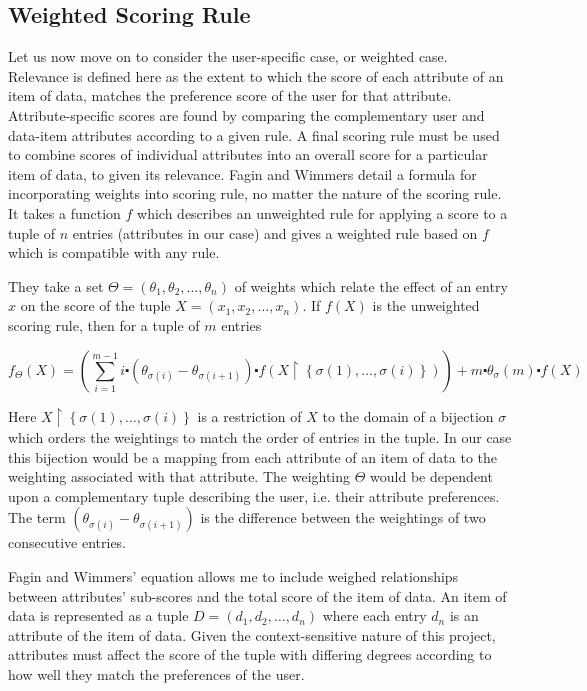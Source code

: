 \subsection{Weighted Scoring Rule}

Let us now move on to consider the user-specific case, or weighted case. Relevance is defined here as the extent to which the score of each attribute of an item of data, matches the preference score of the user for that attribute. Attribute-specific scores are found by comparing the complementary user and data-item attributes according to a given rule. A final scoring rule must be used to combine scores of individual attributes into an overall score for a particular item of data, to given its relevance.
Fagin and Wimmers \cite{FaginWimmers1} detail a formula for incorporating weights into scoring rule, no matter the nature of the scoring rule. It takes a function $f$ which describes an unweighted rule for applying a score to a tuple of $n$ entries (attributes in our case) and gives a weighted rule based on $f$ which is compatible with any rule. 

They take a set $\Theta = (\theta_1,\theta_2,\dotsc,\theta_n)$ of weights which relate the effect of an entry $x$ on the score of the tuple $ X = (x_1, x_2, \dots, x_n)$. If $f(X)$ is the unweighted scoring rule, then for a tuple of $m$ entries

\begin{equation}\label{WeightedRule}	
	f_\Theta (X) = \left(\sum_{i=1}^{m-1} i\centerdot (\theta_{\sigma{(i)}} - \theta_{\sigma{(i+1)}})\centerdot f(X\upharpoonright\left\{\sigma(1),\dots,\sigma(i)\right\})\right) + m \centerdot \theta_\sigma{(m)} \centerdot f(X)
\end{equation}

Here $X\upharpoonright\left\{\sigma(1),\dots,\sigma(i)\right\}$ is a restriction of $X$ to the domain of a bijection $\sigma$ which orders the weightings to match the order of entries in the tuple. In our case this bijection would be a mapping from each attribute of an item of data to the weighting associated with that attribute. The weighting $\Theta$ would be dependent upon a complementary tuple describing the user, i.e. their attribute preferences. The term $(\theta_{\sigma{(i)}} - \theta_{\sigma{(i+1)}})$ is the difference between the weightings of two consecutive entries. 

Fagin and Wimmers' equation allows me to include weighed relationships between attributes' sub-scores and the total score of the item of data. An item of data is represented as a tuple $ D = (d_1, d_2, \dots, d_n)$ where each entry $d_n$ is an attribute of the item of data. Given the context-sensitive nature of this project, attributes must affect the score of the tuple with differing degrees according to how well they match the preferences of the user. 

